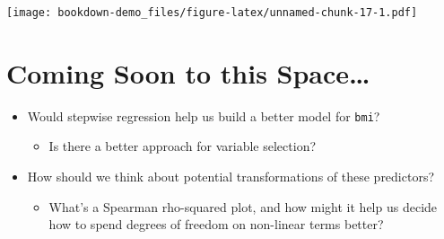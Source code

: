 \documentclass[]{book}
\providecommand{\tightlist}{%
  \setlength{\itemsep}{0pt}\setlength{\parskip}{0pt}}
\theoremstyle{definition}
\theoremstyle{definition}
\theoremstyle{definition}
\theoremstyle{remark}
\begin{document}
\texttt{[image: bookdown-demo\_files/figure-latex/unnamed-chunk-17-1.pdf]}

\section{Coming Soon to this
Space\ldots{}}\label{coming-soon-to-this-space}

\begin{itemize}
\tightlist
\item
  Would stepwise regression help us build a better model for
  \texttt{bmi}?

  \begin{itemize}
  \tightlist
  \item
    Is there a better approach for variable selection?
  \end{itemize}
\item
  How should we think about potential transformations of these
  predictors?

  \begin{itemize}
  \tightlist
  \item
    What's a Spearman rho-squared plot, and how might it help us decide
    how to spend degrees of freedom on non-linear terms better?
  \end{itemize}
\end{itemize}


\end{document}
